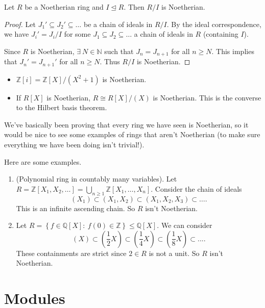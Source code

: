\documentclass[egregdoesnotlikesansseriftitles,a4paper]{scrartcl}
\begin{document}
\begin{lemma}
       Let $R$ be a Noetherian ring and $I \unlhd R$. Then $R/I$ is Noetherian.
       \begin{proof}
              Let $J_1' \subseteq J_2' \subseteq \ldots$ be a chain of ideals in $R/I$. By the ideal correspondence, we have $J_{i}'=J_{i}/I $ for some $J_1 \subseteq J_2 \subseteq \ldots$ a chain of ideals in $R$ (containing $I$).

              Since $R$ is Noetherian, $\exists \ N \in \mathbb{N}$ such that $J_{n}=J_{n+1}$ for all $n \geq N$. This implies that $J_{n}'=J_{n+1}'$ for all $n \geq N$. Thus $R/I$ is Noetherian.
       \end{proof}
\end{lemma}
\begin{example*}
       \begin{itemize}
             \item $\mathbb{Z}[i]=\mathbb{Z}[X]/(X^2+1)$ is Noetherian.
             \item If $R[X]$ is Noetherian, $R \cong R[X]/(X)$ is Noetherian. This is the converse to the Hilbert basis theorem.
       \end{itemize}
\end{example*}
We've basically been proving that every ring we have seen is Noetherian, so it would be nice to see some examples of rings that aren't Noetherian (to make sure everything we have been doing isn't trivial!).
\begin{example*}
      Here are some examples.
      \begin{enumerate}
            \item (Polynomial ring in countably many variables). Let $R=\mathbb{Z}[X_1 , X_2 ,\ldots]=\bigcup_{n \geq 1}\mathbb{Z}[X_1 , \ldots, X_n]$. Consider the chain of ideals \[
             (X_1 ) \subset (X_1 ,X_2 ) \subset (X_1 , X_2 ,X_3 )\subset \ldots
             .\] This is an infinite ascending chain. So $R$ isn't Noetherian.
            \item Let $R=\left\{f \in \mathbb{Q}[X]: \ f (0)\in \mathbb{Z}\right\}\leq \mathbb{Q}[X]$. We can consider \[
            (X)\subset (\frac{1}{2}X) \subset (\frac{1}{4}X) \subset (\frac{1}{8}X) \subset...
            .\] These containments are strict since $2 \in R$ is not a unit. So $R$ isn't Noetherian.
      \end{enumerate}
\end{example*}
\newpage
\section{Modules}
\end{document}
